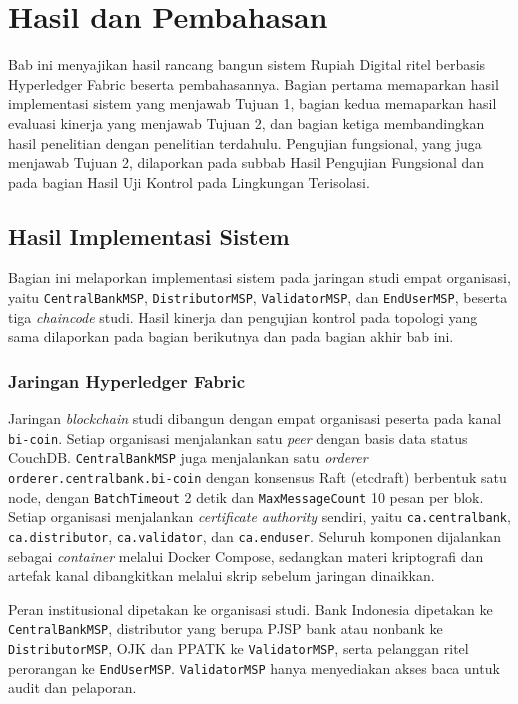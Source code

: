 \chapter{Hasil dan Pembahasan}

Bab ini menyajikan hasil rancang bangun sistem Rupiah Digital ritel berbasis
Hyperledger Fabric beserta pembahasannya. Bagian pertama memaparkan hasil
implementasi sistem yang menjawab Tujuan 1, bagian kedua memaparkan hasil
evaluasi kinerja yang menjawab Tujuan 2, dan bagian
ketiga membandingkan hasil penelitian dengan penelitian terdahulu. Pengujian fungsional, yang juga menjawab Tujuan 2, dilaporkan pada subbab Hasil Pengujian Fungsional dan pada bagian Hasil Uji Kontrol pada Lingkungan Terisolasi.

\section{Hasil Implementasi Sistem}

Bagian ini melaporkan implementasi sistem pada jaringan studi empat organisasi,
yaitu \texttt{CentralBankMSP}, \texttt{DistributorMSP}, \texttt{ValidatorMSP}, dan
\texttt{EndUserMSP}, beserta tiga \textit{chaincode} studi. Hasil kinerja dan
pengujian kontrol pada topologi yang sama dilaporkan pada bagian berikutnya dan
pada bagian akhir bab ini.

\subsection{Jaringan Hyperledger Fabric}

Jaringan \textit{blockchain} studi dibangun dengan empat organisasi peserta pada
kanal \texttt{bi-coin}. Setiap organisasi menjalankan satu \textit{peer}
dengan basis data status CouchDB. \texttt{CentralBankMSP} juga menjalankan satu
\textit{orderer} \texttt{orderer.centralbank.bi-coin} dengan konsensus Raft (etcdraft) berbentuk satu node, dengan
\texttt{BatchTimeout} 2 detik dan \texttt{MaxMessageCount} 10 pesan per blok.
Setiap organisasi menjalankan \textit{certificate authority} sendiri, yaitu
\texttt{ca.centralbank}, \texttt{ca.distributor}, \texttt{ca.validator}, dan \texttt{ca.enduser}. Seluruh komponen dijalankan sebagai \textit{container}
melalui Docker Compose, sedangkan materi kriptografi dan artefak kanal
dibangkitkan melalui skrip sebelum jaringan dinaikkan.

Peran institusional dipetakan ke organisasi studi. Bank Indonesia dipetakan ke
\texttt{CentralBankMSP}, distributor yang berupa PJSP bank atau nonbank ke \texttt{DistributorMSP}, OJK dan PPATK
ke \texttt{ValidatorMSP}, serta pelanggan ritel perorangan ke \texttt{EndUserMSP}. \texttt{ValidatorMSP} hanya menyediakan akses
baca untuk audit dan pelaporan.

